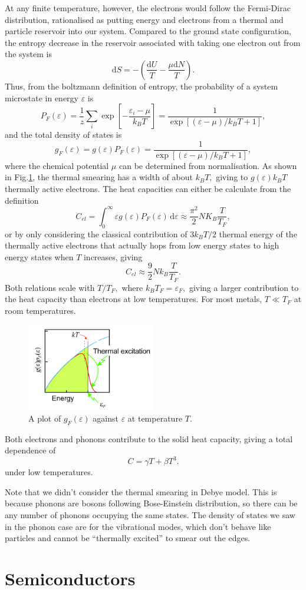 \documentclass{article}
\theoremstyle{nonumberplain}
\begin{document}
At any finite temperature, however, the electrons would follow the Fermi-Dirac distribution, rationalised as putting energy and electrons from a thermal and particle reservoir into our system. Compared to the ground state configuration, the entropy decrease in the reservoir associated with taking one electron out from the system is
\[
    \mathrm{d} S = -\left(\frac{\mathrm{d} U}{T} - \frac{\mu \mathrm{d} N}{T}\right).
\]
Thus, from the boltzmann definition of entropy, the probability of a system microstate in energy $\varepsilon$ is 
\[
    P_F(\varepsilon) = \frac{1}{z}\sum_{i}^{} \exp \left[ -\frac{\varepsilon_i - \mu }{k_B T}\right] = \frac{1}{\exp \left[(\varepsilon  - \mu ) / k_B T + 1\right]}, 
\]
and the total density of states is 
\[
    \boxed{g_F(\varepsilon ) = g(\varepsilon ) P_F(\varepsilon ) = \frac{1}{\exp \left[(\varepsilon  - \mu ) / k_B T + 1\right]}},
\]
where the chemical potential $\mu$ can be determined from normalisation. As shown in Fig.\ref{fig:electron-fd}, the thermal smearing has a width of about $k_B T,$ giving to $g(\varepsilon) k_B T$ thermally active electrons. The heat capacities can either be calculate from the definition
\[
    C_{el} = \int_{0}^{\infty} \varepsilon g(\varepsilon ) P_F(\varepsilon ) \,\mathrm{d}\varepsilon  \approx \frac{\pi ^{2} }{2}N K_B \frac{T}{T_F},
\]
or by only considering the classical contribution of $3 k_B T /2$ thermal energy of the thermally active electrons that actually hops from low energy states to high energy states when $T$ increases, giving
\[
    C_{el} \approx \frac{9}{2} N k_B \frac{T}{T_F}. 
\]
Both relations scale with $T / T_F,$ where $k_B T_F = \varepsilon_F,$ giving a larger contribution to the heat capacity than electrons at low temperatures. For most metals, $T \ll T_F$ at room temperatures. 
\begin{figure}[ht]
    \centering
    \includegraphics[width=0.5\textwidth]{figs/fd-distribution.png}
    \caption{A plot of $g_F(\varepsilon)$ against $\varepsilon$ at temperature $T.$}
    \label{fig:electron-fd}
\end{figure}

Both electrons and phonons contribute to the solid heat capacity, giving a total dependence of 
\[
    C = \gamma T + \beta T^3. 
\]
under low temperatures. 

Note that we didn't consider the thermal smearing in Debye model. This is because phonons are bosons following Bose-Einstein distribution, so there can be any number of phonons occupying the same states. The density of states we saw in the phonon case are for the vibrational modes, which don't behave like particles and cannot be ``thermally excited'' to smear out the edges. 
\section{Semiconductors}
\end{document}
